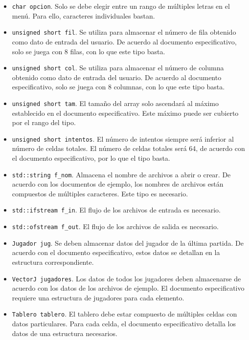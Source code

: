 \documentclass[12pt]{article}
\begin{document}
\begin{itemize}

\item \texttt{char opcion}. Solo se debe elegir entre un rango de
múltiples letras en el menú. Para ello, caracteres individuales bastan.

\item \texttt{unsigned short fil}. Se utiliza para almacenar el número
de fila obtenido como dato de entrada del usuario. De acuerdo al documento
especificativo, solo se juega con 8 filas, con lo que este tipo basta.

\item \texttt{unsigned short col}. Se utiliza para almacenar el número
de columna obtenido como dato de entrada del usuario. De acuerdo al documento
especificativo, solo se juega con 8 columnas, con lo que este tipo basta.

\item \texttt{unsigned short tam}. El tamaño del array solo ascendará
al máximo establecido en el documento especificativo. Este máximo puede ser
cubierto por el rango del tipo.

\item \texttt{unsigned short intentos}. El número de intentos siempre
será inferior al número de celdas totales. El número de celdas totales será 64,
de acuerdo con el documento especificativo, por lo que el tipo basta.

\item \texttt{std::string f_nom}. Almacena el nombre de archivos a
abrir o crear. De acuerdo con los documentos de ejemplo, los nombres de archivos
están compuestos de múltiples caracteres. Este tipo es necesario.

\item \texttt{std::ifstream f_in}. El flujo de los archivos de entrada
es necesario.

\item \texttt{std::ofstream f_out}. El flujo de los archivos de salida
es necesario.

\item \texttt{Jugador jug}. Se deben almacenar datos del jugador de la
última partida. De acuerdo con el documento especificativo, estos datos se
detallan en la estructura correspondiente.

\item \texttt{VectorJ jugadores}. Los datos de todos los jugadores
deben almacenarse de acuerdo con los datos de los archivos de ejemplo. El
documento especificativo requiere una estructura de jugadores para cada
elemento.

\item \texttt{Tablero tablero}. El tablero debe estar compuesto de
múltiples celdas con datos particulares. Para cada celda, el documento
especificativo detalla los datos de una estructura necesarios.

\end{itemize}
\end{document}
